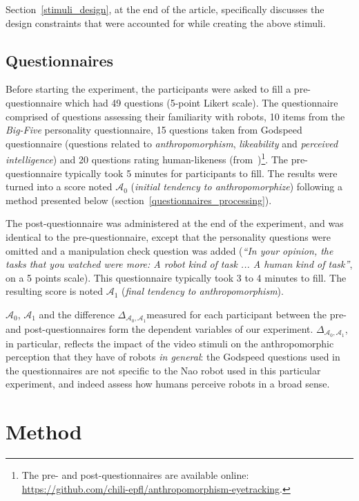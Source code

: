 \documentclass[lettersize, noapacite, twoside, HRI]{apa_HRI}
\newcommand{\anti}{{$\mathcal{A}_0$\xspace}}
\newcommand{\antf}{{$\mathcal{A}_1$\xspace}}
\newcommand{\deltaant}{{ $\Delta_{\mathcal{A}_0,\mathcal{A}_1}$\xspace}}
\begin{document}
Section~\ref{stimuli_design}, at the end of the article, specifically discusses
the design constraints that were accounted for while creating the above stimuli.

\subsection{Questionnaires}

Before starting the experiment, the participants were asked to fill a
pre-questionnaire which had 49 questions (5-point Likert scale). The
questionnaire comprised of questions assessing their familiarity with robots, 10
items from the \emph{Big-Five} personality questionnaire, 15 questions taken from
Godspeed questionnaire (questions related to \emph{anthropomorphism},
\emph{likeability} and \emph{perceived intelligence}) and 20 questions rating
human-likeness (from~\cite{ruijten_introducing_2014})\footnote{The
pre- and post-questionnaires are available online:
\url{https://github.com/chili-epfl/anthropomorphism-eyetracking}.}. The pre-questionnaire
typically took 5 minutes for participants to fill. The results were turned into
a score noted \anti{} (\emph{initial tendency to anthropomorphize}) following a
method presented below (section~\ref{questionnaires_processing}).

The post-questionnaire was administered at the end of the experiment, and was
identical to the pre-questionnaire, except that the personality questions were omitted and a
manipulation check question was added (\emph{``In your opinion, the tasks that
you watched were more: A robot kind of task ... A human kind of task''}, on a 5
points scale).
This questionnaire typically took 3 to 4 minutes to fill. The resulting score is
noted \antf{} (\emph{final tendency to anthropomorphism}).

\anti{}, \antf{} and the difference \deltaant measured for each participant between
the pre- and post-questionnaires form the dependent variables of our experiment.
\deltaant, in particular, reflects the impact of the video stimuli on the
anthropomorphic perception that they have of robots \emph{in general}: the
Godspeed questions used in the questionnaires are not specific to the Nao robot
used in this particular experiment, and indeed assess how humans perceive robots
in a broad sense.

\section{Method}
\end{document}
